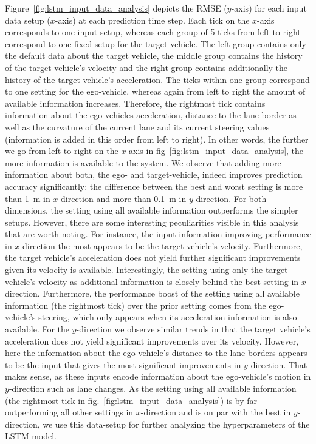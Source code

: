 Figure~\ref{fig:lstm_input_data_analysis} depicts the \ac{RMSE} ($y$-axis) for each input data setup ($x$-axis) at each prediction time step.
Each tick on the $x$-axis corresponds to one input setup, whereas each group of \num{5} ticks from left to right correspond to one fixed setup for the target vehicle.
The left group contains only the default data about the target vehicle, the middle group contains the history of the target vehicle's velocity and the right group contains additionally the history of the target vehicle's acceleration.
The ticks within one group correspond to one setting for the ego-vehicle, whereas again from left to right the amount of available information increases.
Therefore, the rightmost tick contains information about the ego-vehicles acceleration, distance to the lane border as well as the curvature of the current lane and its current steering values (information is added in this order from left to right). 
In other words, the further we go from left to right on the $x$-axis in fig~\ref{fig:lstm_input_data_analysis}, the more information is available to the system.
We observe that adding more information about both, the ego- and target-vehicle, indeed improves prediction accuracy significantly: the difference between the best and worst setting is more than \SI{1}{\meter} in $x$-direction and more than \SI{0.1}{\meter} in $y$-direction.
For both dimensions, the setting using all available information outperforms the simpler setups.
However, there are some interesting peculiarities visible in this analysis that are worth noting.
For instance, the input information improving performance in $x$-direction the most appears to be the target vehicle's velocity. 
Furthermore, the target vehicle's acceleration does not yield further significant improvements given its velocity is available.
Interestingly, the setting using only the target vehicle's velocity as additional information is closely behind the best setting in $x$-direction.
Furthermore, the performance boost of the setting using all available information (the rightmost tick) over the prior setting comes from the ego-vehicle's steering, which only appears when its acceleration information is also available.
For the $y$-direction we observe similar trends in that the target vehicle's acceleration does not yield significant improvements over its velocity.
However, here the information about the ego-vehicle's distance to the lane borders appears to be the input that gives the most significant improvements in $y$-direction.
That makes sense, as these inputs encode information about the ego-vehicle's motion in $y$-direction such as lane changes.
As the setting using all available information (the rightmost tick in fig.~\ref{fig:lstm_input_data_analysis}) is by far outperforming all other settings in $x$-direction and is on par with the best in $y$-direction, we use this data-setup for further analyzing the hyperparameters of the \ac{LSTM}-model.

